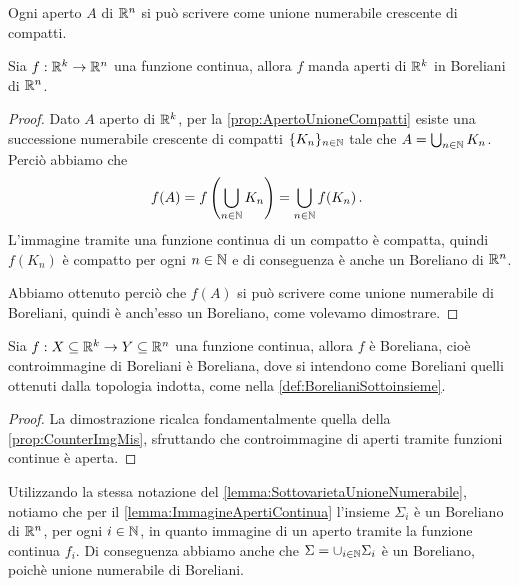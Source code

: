 \begin{proposition}\label{prop:ApertoUnioneCompatti}
	Ogni aperto $A$ di $\mathbb R^n$ si può scrivere come unione numerabile crescente di compatti.
\end{proposition}

\begin{lemma}\label{lemma:ImmagineApertiContinua}
	Sia $f:\mathbb R^k\to\mathbb R^n$ una funzione continua, allora $f$ manda aperti di $\mathbb R^k$ in Boreliani di $\mathbb R^n$.
\end{lemma}
\begin{proof}
	Dato $A$ aperto di $\mathbb R^k$, per la \cref{prop:ApertoUnioneCompatti} esiste una successione numerabile crescente di compatti $\{K_n\}_{n\in\mathbb N}$ tale che $A=\bigcup_{n\in\mathbb N}K_n$. Perciò abbiamo che
	\begin{equation*}
		f(A)=f\left(\bigcup_{n\in\mathbb N}K_n\right)=\bigcup_{n\in\mathbb N}f(K_n)\, \text{. }
	\end{equation*}
	L'immagine tramite una funzione continua di un compatto è compatta, quindi $f(K_n)$ è compatto per ogni $n\in\mathbb N$ e di conseguenza è anche un Boreliano di $\mathbb R^n$.
	
	Abbiamo ottenuto perciò che $f(A)$ si può scrivere come unione numerabile di Boreliani, quindi è anch'esso un Boreliano, come volevamo dimostrare.	
\end{proof}

\begin{lemma}\label{lemma:ContinuaImplicaBoreliana}
	Sia $f:X\subseteq\mathbb R^k\to Y\subseteq\mathbb R^n$ una funzione continua, allora $f$ è Boreliana, cioè controimmagine di Boreliani è Boreliana, dove si intendono come Boreliani quelli ottenuti dalla topologia indotta, come nella \cref{def:BorelianiSottoinsieme}. 
\end{lemma}
\begin{proof}
	La dimostrazione ricalca fondamentalmente quella della \cref{prop:CounterImgMis}, sfruttando che controimmagine di aperti tramite funzioni continue è aperta.
\end{proof}

\begin{remark}\label{nota:SigmaBoreliano}
	Utilizzando la stessa notazione del \cref{lemma:SottovarietaUnioneNumerabile}, notiamo che per il \cref{lemma:ImmagineApertiContinua} l'insieme $\Sigma_i$ è un Boreliano di $\mathbb R^n$, per ogni $i\in\mathbb N$, in quanto immagine di un aperto tramite la funzione continua $f_i$. Di conseguenza abbiamo anche che $\Sigma=\cup_{i\in\mathbb N}\Sigma_i$ è un Boreliano, poichè unione numerabile di Boreliani.  
\end{remark}

